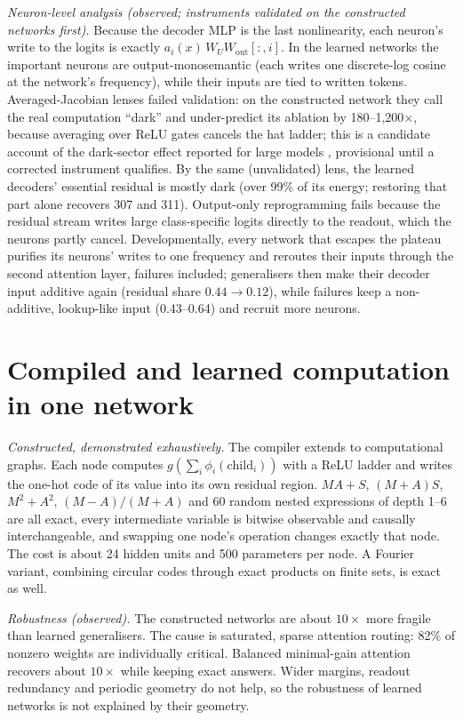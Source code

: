 \documentclass[11pt]{article}
\begin{document}
\emph{Neuron-level analysis (observed; instruments validated on the constructed networks first).} Because the decoder
MLP is the last nonlinearity, each neuron's write to the logits is exactly $a_i(x)\,W_UW_{\mathrm{out}}[:,i]$. In the
learned networks the important neurons are output-monosemantic (each writes one discrete-log cosine at the network's
frequency), while their inputs are tied to written tokens. Averaged-Jacobian lenses failed validation: on the
constructed network they call the real computation ``dark'' and under-predict its ablation by 180--1,200$\times$,
because averaging over ReLU gates cancels the hat ladder; this is a candidate account of the dark-sector effect reported
for large models \citep{neuronlens2026}, provisional until a corrected instrument qualifies. By the same (unvalidated)
lens, the learned decoders' essential residual is mostly dark (over 99\% of its energy; restoring that part alone
recovers 307 and 311). Output-only reprogramming fails because the residual stream
writes large class-specific logits directly to the readout, which the neurons partly cancel. Developmentally, every
network that escapes the plateau purifies its neurons' writes to one frequency and reroutes their inputs through the
second attention layer, failures included; generalisers then make their decoder input additive again (residual share
$0.44\to0.12$), while failures keep a non-additive, lookup-like input (0.43--0.64) and recruit more neurons.

\section{Compiled and learned computation in one network}\label{sec:hybrid}
\emph{Constructed, demonstrated exhaustively.} The compiler extends to computational graphs. Each node computes
$g(\sum_i\phi_i(\text{child}_i))$ with a ReLU ladder and writes the one-hot code of its value into its own residual
region. $MA+S$, $(M+A)S$, $M^2+A^2$, $(M-A)/(M+A)$ and 60 random nested expressions of depth 1--6 are all exact, every
intermediate variable is bitwise observable and causally interchangeable, and swapping one node's operation changes
exactly that node. The cost is about 24 hidden units and 500 parameters per node. A Fourier variant, combining circular
codes through exact products on finite sets, is exact as well.

\emph{Robustness (observed).} The constructed networks are about $10\times$ more fragile than learned generalisers. The
cause is saturated, sparse attention routing: 82\% of nonzero weights are individually critical. Balanced
minimal-gain attention recovers about $10\times$ while keeping exact answers. Wider margins, readout redundancy and
periodic geometry do not help, so the robustness of learned networks is not explained by their geometry.
\end{document}
